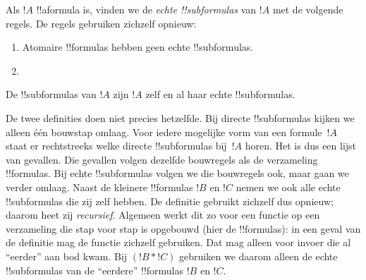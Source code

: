 \documentclass[openany]{memoir}
\begin{document}
\begin{defn}
Als $!A$ !!a{formula} is, vinden we de \emph{echte !!{subformula}s}
van $!A$ met de volgende regels. De regels gebruiken zichzelf opnieuw:
\begin{enumerate}
\item Atomaire !!{formula}s hebben geen echte !!{subformula}s.


\item {}


\end{enumerate}
\end{defn}

\begin{defn}[!!^{subformula}]
De !!{subformula}s van $!A$ zijn $!A$ zelf en al haar echte
!!{subformula}s.
\end{defn}

\begin{explain}
De twee definities doen niet precies hetzelfde. Bij directe
!!{subformula}s kijken we alleen één bouwstap omlaag. Voor iedere
mogelijke vorm van een formule~$!A$ staat er rechtstreeks welke
directe !!{subformula}s bij~$!A$ horen. Het is dus een lijst van
gevallen. Die gevallen volgen dezelfde bouwregels als de verzameling
!!{formula}s. Bij echte !!{subformula}s volgen we die bouwregels ook,
maar gaan we verder omlaag. Naast de kleinere !!{formula}s $!B$ en
$!C$ nemen we ook alle echte !!{subformula}s die zij zelf hebben. De
definitie gebruikt zichzelf dus opnieuw; daarom heet zij
\emph{recursief}. Algemeen werkt dit zo voor een functie op een
verzameling die stap voor stap is opgebouwd (hier de !!{formula}s): in
een geval van de definitie mag de functie zichzelf gebruiken. Dat mag
alleen voor invoer die al ``eerder'' aan bod kwam. Bij $(!B \ast !C)$
gebruiken we daarom alleen de echte !!{subformula}s van de ``eerdere''
!!{formula}s $!B$ en $!C$.
\end{explain}
\end{document}
